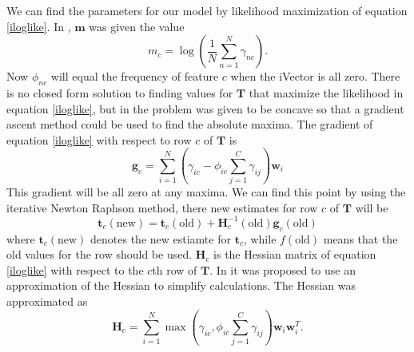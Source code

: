 We can find the parameters for our model by likelihood maximization of equation \ref{iloglike}. In \cite{lrivector}, $\mathbf{m}$ was given the value
\begin{equation}
\label{mest}
m_c=\log\left(\frac{1}{N} \sum_{n=1}^N \gamma_{nc}\right).
\end{equation} 
Now $\phi_{nc}$ will equal the frequency of feature $c$ when the iVector is all zero. There is no closed form solution to finding values for $\mathbf{T}$ that maximize the likelihood in equation \ref{iloglike}, but in \cite{lrivector} the problem was given to be concave so that a gradient ascent method could be used to find the absolute maxima. The gradient of equation \ref{iloglike} with respect to row $c$ of $\mathbf{T}$ is
\begin{equation}
\label{tgrad}
\mathbf{g}_c = \sum_{i=1}^N\left(\gamma_{ic} - \phi_{ic} \sum_{j=1}^C \gamma_{ij} \right) \mathbf{w}_i
\end{equation}
This gradient will be all zero at any maxima. We can find this point by using the iterative Newton Raphson method, there new estimates for row $c$ of $\mathbf{T}$ will be
\begin{equation}
\label{tupdate}
\mathbf{t}_c(\text{new}) = \mathbf{t}_c(\text{old})+\mathbf{H}_c^{-1}(\text{old})\mathbf{g}_c(\text{old})
\end{equation}
where $\mathbf{t}_c(\text{new})$ denotes the new estiamte for $\mathbf{t}_c$, while $f(\text{old})$ means that the old values for the row should be used. $\mathbf{H}_c$ is the Hessian matrix of equation \ref{iloglike} with respect to the $c$th row of $\mathbf{T}$. In \cite{srivector} it was proposed to use an approximation of the Hessian to simplify calculations. The Hessian was approximated as
\begin{equation}
\label{thessian}
\mathbf{H}_c = \sum_{i=1}^N \max\left(\gamma_{ic}, \phi_{ic} \sum_{j=1}^C \gamma_{ij}\right)\mathbf{w}_i \mathbf{w}_i^T.
\end{equation}

